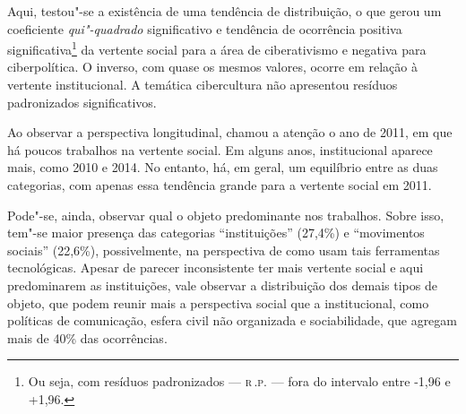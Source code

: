 {

Aqui, testou"-se a existência de uma tendência de distribuição, o que
gerou um coeficiente \textit{qui"-quadrado} significativo e tendência de
ocorrência positiva significativa\footnote{Ou seja, com resíduos padronizados ---
\textsc{r\,.p.} --- fora do intervalo entre -1,96 e +1,96.} da vertente social para a
área de ciberativismo e negativa para ciberpolítica. O inverso, com
quase os mesmos valores, ocorre em relação à vertente institucional. A
temática cibercultura não apresentou resíduos padronizados
significativos.

Ao observar a perspectiva longitudinal, chamou a atenção o ano de 2011,
em que há poucos trabalhos na vertente social. Em alguns anos,
institucional aparece mais, como 2010 e 2014. No entanto, há, em geral,
um equilíbrio entre as duas categorias, com apenas essa tendência grande
para a vertente social em 2011.

Pode"-se, ainda, observar qual o objeto predominante nos trabalhos. Sobre
isso, tem"-se maior presença das categorias ``instituições'' (27,4\%) e
``movimentos sociais'' (22,6\%), possivelmente, na perspectiva de como
usam tais ferramentas tecnológicas. Apesar de parecer inconsistente ter
mais vertente social e aqui predominarem as instituições, vale observar
a distribuição dos demais tipos de objeto, que podem reunir mais a
perspectiva social que a institucional, como políticas de comunicação,
esfera civil não organizada e sociabilidade, que agregam mais de 40\%
das ocorrências.

}
